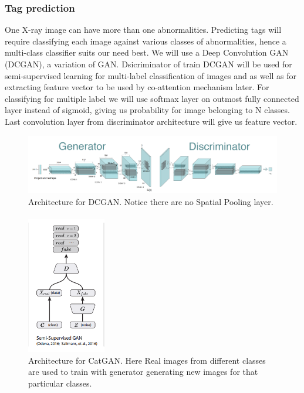 \documentclass[12pt]{article}
\numberwithin{figure}{section}
\begin{document}
\subsubsection{Tag prediction}

One X-ray image can have more than one abnormalities. Predicting tags will require classifying each image against various classes of abnormalities, hence a multi-class classifier suits our need best. We will use a Deep Convolution GAN (DCGAN)\cite{3}, a variation of GAN. Dsicriminator of train DCGAN will  be used for semi-supervised learning for multi-label classification of images and as well as for extracting feature vector to be used by co-attention mechanism later. For classifying for multiple label we will use softmax layer on outmost fully connected layer instead of sigmoid, giving us probability for image belonging to N classes. Last convolution layer from discriminator architecture will give us feature vector.
\begin{figure}[h]
    \centering
    \includegraphics[width=\textwidth]{dcgan.png}
    \caption{Architecture for DCGAN. Notice there are no Spatial Pooling layer.}
    \label{fig:my_label}
\end{figure}
\paragraph{}
\begin{figure}[h]
    \centering
    \includegraphics[width=130]{ACGAN.png}
    \caption{Architecture for CatGAN. Here Real images from different classes are used to train with generator generating new images for that particular classes.}
    \label{fig:my_label}
\end{figure}
\end{document}
